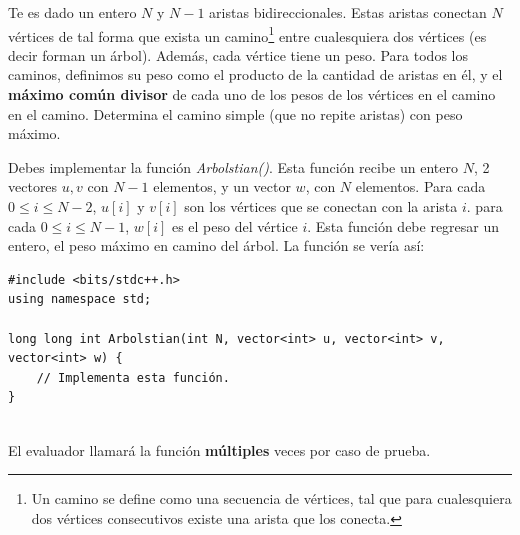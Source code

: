 \documentclass[12pt]{scrartcl}
\begin{document}
    
    
    \vspace{10pt}

    
    
        Te es dado un entero $N$ y $N - 1$ aristas bidireccionales. Estas aristas conectan $N$ vértices de tal forma que exista un camino\footnote{Un camino se define como una secuencia de vértices, tal que para cualesquiera dos vértices consecutivos existe una arista que los conecta.} entre cualesquiera dos vértices (es decir forman un árbol). Además, cada vértice tiene un peso. Para todos los caminos, definimos su peso como el producto de la cantidad de aristas en él, y el {\bfseries máximo común divisor} de cada uno de los pesos de los vértices en el camino en el camino. Determina el camino simple (que no repite aristas) con peso máximo.
    

        Debes implementar la función \textit{Arbolstian()}. Esta función recibe un entero $N$, 2 vectores $u, v$ con $N - 1$ elementos, y un vector $w$, con $N$ elementos. Para cada $0 \le i \le N - 2$, $u[i]$ y $v[i]$ son los vértices que se conectan con la arista $i$. para cada $0 \le i \le N - 1$, $w[i]$ es el peso del vértice $i$. Esta función debe regresar un entero, el peso máximo en camino del árbol.
        La función se vería así:

\begin{verbatim}
#include <bits/stdc++.h>
using namespace std;

long long int Arbolstian(int N, vector<int> u, vector<int> v, vector<int> w) {
    // Implementa esta función.
}
    
\end{verbatim}

    El evaluador llamará la función \textbf{múltiples} veces por caso de prueba.

    
\end{document}
